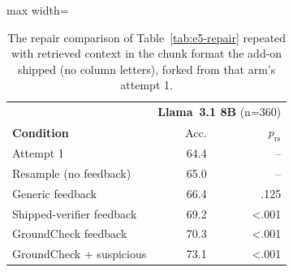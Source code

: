 \begin{table}
\caption{The repair comparison of Table~\ref{tab:e5-repair} repeated with retrieved context in the chunk format the add-on shipped (no column letters), forked from that arm's attempt 1.}
\label{tab:e5-repair-shipped}

\centering\footnotesize
\begin{adjustbox}{max width=\columnwidth}\begin{tabular}{l rr}
\toprule
& \multicolumn{2}{c}{\textbf{Llama~3.1 8B} (n=360)} \\
\textbf{Condition} & Acc. & $p_{\text{rs}}$ \\
\midrule
Attempt 1 & 64.4 & -- \\
Resample (no feedback) & 65.0 & -- \\
Generic feedback & 66.4 & .125 \\
Shipped-verifier feedback & 69.2 & <.001 \\
GroundCheck feedback & 70.3 & <.001 \\
GroundCheck + suspicious & 73.1 & <.001 \\
\bottomrule
\end{tabular}\end{adjustbox}
\end{table}
